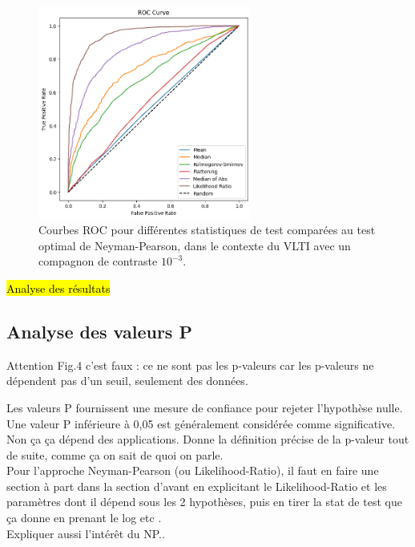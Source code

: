 \documentclass{article}
\newcommand{\dm}[1]{{\color{mulberry} #1}}
\begin{document}
\begin{figure}[H]
\centering
\includegraphics[width=7cm]{img/neyman_pearson.png}
\caption{Courbes ROC pour différentes statistiques de test comparées au test optimal de Neyman-Pearson, dans le contexte du VLTI avec un compagnon de contraste $10^{-3}$.}
\label{fig:neyman-pearson}
\end{figure}

\hl{Analyse des résultats}

\subsection{Analyse des valeurs P}

\dm{Attention Fig.4 c'est faux : ce ne sont pas les p-valeurs car les p-valeurs ne dépendent pas d'un seuil, seulement des données.}

Les valeurs P fournissent une mesure de confiance pour rejeter l'hypothèse nulle. Une valeur P inférieure à 0,05 est généralement considérée comme significative. \dm{Non ça ça dépend des applications. Donne la définition précise de la p-valeur tout de suite, comme ça on sait de quoi on parle. }\\

\dm{Pour l'approche Neyman-Pearson (ou Likelihood-Ratio), il faut en faire une section à part dans la section d'avant en explicitant le Likelihood-Ratio et les paramètres dont il dépend sous les 2 hypothèses, puis en tirer la stat de test que ça donne en prenant le log etc .\\
Expliquer aussi l'intérêt du NP.}.
\end{document}
